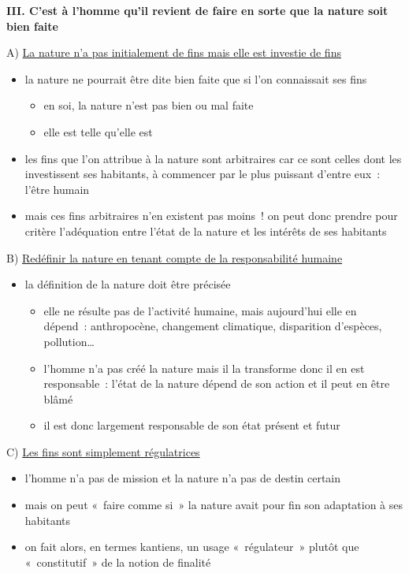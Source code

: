 \documentclass[a4paper,12pt]{article}
\begin{document}
\bigskip


\textbf{III. C'est à l'homme qu'il revient de faire en sorte que la nature soit
bien faite}

\medskip

A) \uline{La nature n'a pas initialement de fins mais elle est investie de fins} 
\begin{itemize}
\item la nature ne pourrait être dite bien faite que si l'on connaissait ses
fins
\begin{itemize}
\item en soi, la nature n'est pas bien ou mal faite
\item elle est telle qu'elle est
\end{itemize}
\item les fins que l'on attribue à la nature sont arbitraires car ce sont
celles dont les investissent ses habitants, à commencer par le plus
puissant d'entre eux : l'être humain
\item mais ces fins arbitraires n'en existent pas moins ! on peut donc
prendre pour critère l'adéquation entre l'état de la nature et les
intérêts de ses habitants
\end{itemize}

\medskip

B) \uline{Redéfinir la nature en tenant compte de la responsabilité humaine}
\begin{itemize}
\item la définition de la nature doit être précisée
\begin{itemize}
\item elle ne résulte pas de l'activité humaine, mais aujourd'hui elle en
dépend : anthropocène, changement climatique, disparition d'espèces,
pollution\ldots{}
\item l'homme n'a pas créé la nature mais il la transforme donc il en est
responsable : l'état de la nature dépend de son action et il peut en
être blâmé
\item il est donc largement responsable de son état présent et futur
\end{itemize}
\end{itemize}

\medskip

C) \uline{Les fins sont simplement régulatrices}
\begin{itemize}
\item l'homme n'a pas de mission et la nature n'a pas de destin certain
\item mais on peut « faire comme si » la nature avait pour fin son
adaptation à ses habitants
\item on fait alors, en termes kantiens, un usage « régulateur » plutôt que
« constitutif » de la notion de finalité
\end{itemize}
\end{document}

